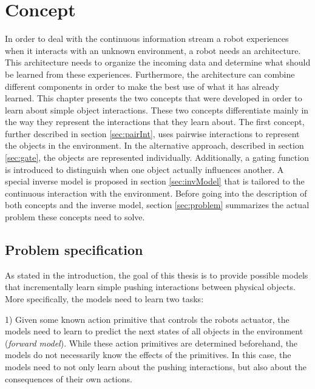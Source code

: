 \chapter{Concept \label{chap:concept}}


In order to deal with the continuous information stream a robot experiences when it interacts with an unknown environment, a robot needs an architecture.
This architecture needs to organize the incoming data and determine what should be learned from these experiences. Furthermore, the architecture can combine different components in order to make the best use of what it has already learned. 
This chapter presents the two concepts that were developed in order to learn about simple object interactions. These two concepts differentiate mainly in the way they represent the interactions that they learn about. The first concept, further described in section \ref{sec:pairInt}, uses pairwise interactions to represent the objects in the environment. In the alternative approach, described in section \ref{sec:gate}, the objects are represented individually. Additionally, a gating function is introduced to distinguish when one object actually influences another. 
A special inverse model is proposed in section \ref{sec:invModel} that is tailored to the continuous interaction with the environment. 
Before going into the description of both concepts and the inverse model, section \ref{sec:problem} summarizes the actual problem these concepts need to solve. 

\section{Problem specification \label{sec:problem}}

As stated in the introduction, the goal of this thesis is to provide possible models that incrementally learn simple pushing interactions between physical objects. 
More specifically, the models need to learn two tasks:

1) Given some known action primitive that controls the robots actuator, the models need to learn to predict the next states of all objects in the environment (\textit{forward model}). 
While these action primitives are determined beforehand, the models do not necessarily know the effects of the primitives. In this case, the models need to not only learn about the pushing interactions, but also about the consequences of their own actions.

